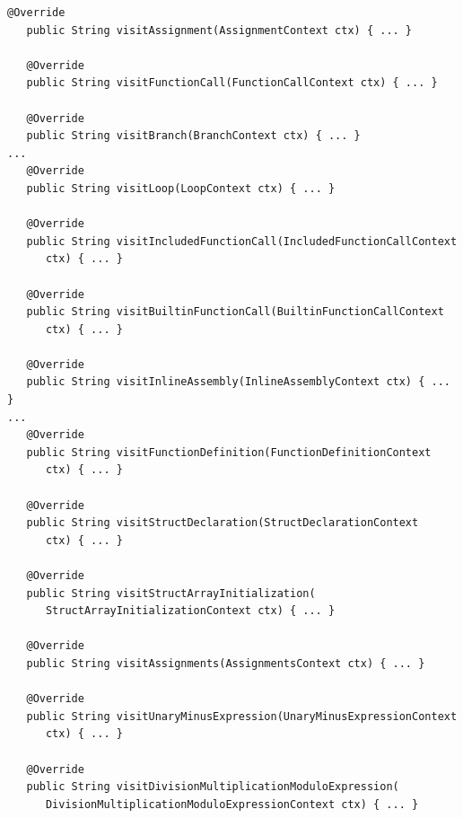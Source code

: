 \begin{lstlisting}[frame=htrbl, caption={Implementation of {\ttfamily EVisitor.java}}, label={lst:visitor}, basicstyle=\footnotesize]
   @Override
   public String visitAssignment(AssignmentContext ctx) { ... }

   @Override
   public String visitFunctionCall(FunctionCallContext ctx) { ... }

   @Override
   public String visitBranch(BranchContext ctx) { ... }
...
   @Override
   public String visitLoop(LoopContext ctx) { ... }

   @Override
   public String visitIncludedFunctionCall(IncludedFunctionCallContext 
      ctx) { ... }

   @Override
   public String visitBuiltinFunctionCall(BuiltinFunctionCallContext 
      ctx) { ... }

   @Override
   public String visitInlineAssembly(InlineAssemblyContext ctx) { ... }
...
   @Override
   public String visitFunctionDefinition(FunctionDefinitionContext 
      ctx) { ... }

   @Override
   public String visitStructDeclaration(StructDeclarationContext 
      ctx) { ... }

   @Override
   public String visitStructArrayInitialization(
      StructArrayInitializationContext ctx) { ... }
      
   @Override
   public String visitAssignments(AssignmentsContext ctx) { ... }

   @Override
   public String visitUnaryMinusExpression(UnaryMinusExpressionContext 
      ctx) { ... }

   @Override
   public String visitDivisionMultiplicationModuloExpression(
      DivisionMultiplicationModuloExpressionContext ctx) { ... }


\end{lstlisting}
